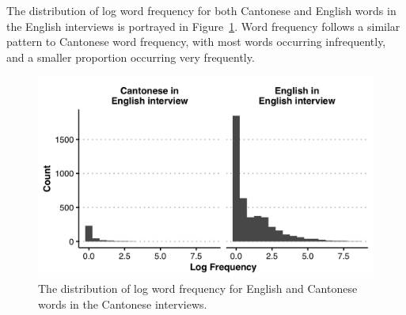 The distribution of log word frequency for both Cantonese and English words in the English interviews is portrayed in Figure~\ref{ch2:fig:englishwordfrequency}. Word frequency follows a similar pattern to Cantonese word frequency, with most words occurring infrequently, and a smaller proportion occurring very frequently.

\begin{figure}[h]
  \begin{center}
  \includegraphics[width=4.9in]{figures/ch2_englishwordfrequency_5in.png} 
  \caption{The distribution of log word frequency for English and Cantonese words in the Cantonese interviews.}
  \label{ch2:fig:englishwordfrequency}
  \end{center}
\end{figure}

